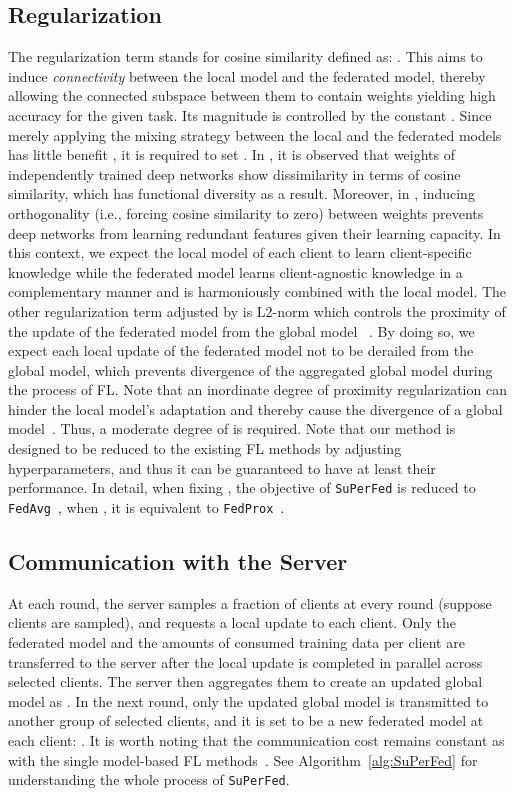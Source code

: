 \documentclass[sigconf]{acmart}
\begin{document}
\subsection{Regularization}
The regularization term  stands for cosine similarity defined as:  . This aims to induce \textit{connectivity} between the local model and the federated model, thereby allowing the connected subspace between them to contain weights yielding high accuracy for the given task. Its magnitude is controlled by the constant . Since merely applying the mixing strategy between the local and the federated models has little benefit \cite{nnsubspaces}, it is required to set . In \cite{fort2019deep, nnsubspaces}, it is observed that weights of independently trained deep networks show dissimilarity in terms of cosine similarity, which has functional diversity as a result. Moreover, in \cite{ortho2,ortho3}, inducing orthogonality (i.e., forcing cosine similarity to zero) between weights prevents deep networks from learning redundant features given their learning capacity. In this context, we expect the local model of each client  to learn client-specific knowledge while the federated model  learns client-agnostic knowledge in a complementary manner and is harmoniously combined with the local model. 
The other regularization term adjusted by  is L2-norm which controls the proximity of the update of the federated model  from the global model ~\cite{fedprox}. By doing so, we expect each local update of the federated model not to be derailed from the global model, which prevents divergence of the aggregated global model during the process of FL. Note that an inordinate degree of proximity regularization can hinder the local model's adaptation and thereby cause the divergence of a global model~\cite{fedprox, pfedme}. Thus, a moderate degree of  is required. 
Note that our method is designed to be reduced to the existing FL methods by adjusting hyperparameters, and thus it can be guaranteed to have at least their performance. In detail, when fixing , the objective of \texttt{SuPerFed} is reduced to \texttt{FedAvg}~\cite{mc+17}, when , it is equivalent to \texttt{FedProx}~\cite{fedprox}.

\subsection{Communication with the Server} At each round, the server samples a fraction of clients at every round (suppose  clients are sampled), and requests a local update to each client. Only the federated model  and the amounts of consumed training data per client  are transferred to the server after the local update is completed in parallel across selected clients. The server then aggregates them to create an updated global model  as .
In the next round, only the updated global model  is transmitted to another group of selected clients, and it is set to be a new federated model at each client: . It is worth noting that the communication cost remains constant as with the single model-based FL methods~\cite{mc+17, fedprox}. See Algorithm~\ref{alg:SuPerFed} for understanding the whole process of \texttt{SuPerFed}.
\end{document}
